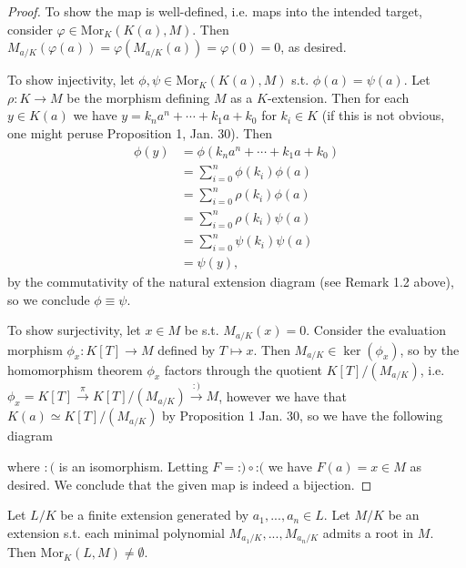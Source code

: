 \begin{proof}
To show the map is well-defined, i.e. maps into the intended target, consider $\varphi \in \text{Mor}_K(K(a), M)$. Then $M_{a/K}(\varphi(a)) = \varphi(M_{a/K}(a)) = \varphi(0) = 0$, as desired.

To show injectivity, let $\phi, \psi \in \text{Mor}_K(K(a), M)$ s.t. $\phi(a) = \psi(a)$. Let $\rho \colon K \rightarrow M$ be the morphism defining $M$ as a $K$-extension. Then for each $y \in K(a)$ we have $y = k_na^n + \cdots + k_1a + k_0$ for $k_i \in K$ (if this is not obvious, one might peruse Proposition 1, Jan. 30). Then 
\begin{align*}
\phi(y) &= \phi(k_na^n + \cdots + k_1a + k_0) \\
&= \sum_{i = 0}^n \phi(k_i) \phi(a) \\
&= \sum_{i = 0}^n \rho(k_i) \phi(a) \\
&= \sum_{i = 0}^n \rho(k_i) \psi(a) \\
&= \sum_{i = 0}^n \psi(k_i) \psi(a) \\
&= \psi(y),
\end{align*}
by the commutativity of the natural extension diagram (see Remark 1.2 above), so we conclude $\phi \equiv \psi$.

To show surjectivity, let $x \in M$ be s.t. $M_{a/K}(x) = 0$. Consider the evaluation morphism $\phi_x \colon K[T] \rightarrow M$ defined by $T \mapsto x$. Then $M_{a/K} \in \ker(\phi_x)$, so by the homomorphism theorem $\phi_x$ factors through the quotient $K[T]/(M_{a/K})$, i.e. $\phi_x = K[T] \stackrel{\pi}{\rightarrow} K[T]/(M_{a/K}) \stackrel{:)}{\rightarrow} M$, however we have that $K(a) \simeq K[T]/(M_{a/K})$ by Proposition 1 Jan. 30, so we have the following diagram
\begin{center}
\end{center}
where $:($ is an isomorphism. Letting $F = \text{:)} \circ \text{:(}$ we have $F(a) = x \in M$ as desired. We conclude that the given map is indeed a bijection. 
\end{proof}

\begin{cor}
Let $L/K$ be a finite extension generated by $a_1, ..., a_n \in L$. Let $M/K$ be an extension s.t. each minimal polynomial $M_{a_1/K}, ..., M_{a_n/K}$ admits a root in $M$. Then Mor$_K(L, M) \neq \emptyset$.
\end{cor}

